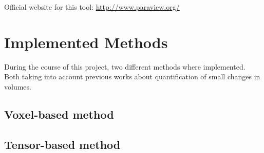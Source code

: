 Official website for this tool: \url{http://www.paraview.org/}

\section{Implemented Methods}
During the course of this project, two different methods where implemented. Both taking into account previous works about quantification of small changes in volumes.

\subsection{Voxel-based method}



\subsection{Tensor-based method}